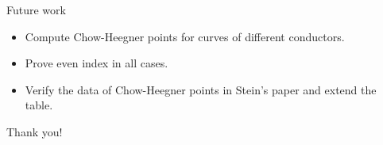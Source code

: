 \documentclass[handout]{beamer}
\begin{document}
\begin{frame}{Future work}

\begin{itemize}
\item Compute Chow-Heegner points for curves of different conductors. 
\item Prove even index in all cases. 
\item Verify the data of Chow-Heegner points in Stein's paper and extend the table.
\end{itemize}

\end{frame}

\begin{frame}
\Huge{\centerline{Thank you!}}
\end{frame}
\end{document}
